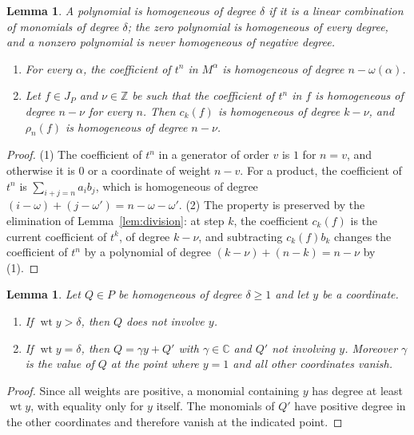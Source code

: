 \documentclass{amsart}
\newtheorem{lemma}[theorem]{Lemma}
\theoremstyle{definition}
\theoremstyle{remark}
\numberwithin{equation}{section}
\newcommand{\CC}{\mathbb{C}}
\newcommand{\ZZ}{\mathbb{Z}}
\DeclareMathOperator{\wt}{wt}
\begin{document}
\begin{lemma}\label{lem:homog}
A polynomial is homogeneous of degree $\delta$ if it is a linear combination of monomials of degree $\delta$; the zero polynomial is homogeneous of every degree, and a nonzero polynomial is never homogeneous of negative degree.
\begin{enumerate}
\item For every $\alpha$, the coefficient of $t^n$ in $M^\alpha$ is homogeneous of degree $n-\omega(\alpha)$.
\item Let $f\in J_P$ and $\nu\in\ZZ$ be such that the coefficient of $t^n$ in $f$ is homogeneous of degree $n-\nu$ for every $n$. Then $c_k(f)$ is homogeneous of degree $k-\nu$, and $\rho_n(f)$ is homogeneous of degree $n-\nu$.
\end{enumerate}
\end{lemma}

\begin{proof}
(1) The coefficient of $t^n$ in a generator of order $v$ is $1$ for $n=v$, and otherwise it is $0$ or a coordinate of weight $n-v$. For a product, the coefficient of $t^n$ is $\sum_{i+j=n}a_ib_j$, which is homogeneous of degree $(i-\omega)+(j-\omega')=n-\omega-\omega'$. (2) The property is preserved by the elimination of Lemma~\ref{lem:division}: at step $k$, the coefficient $c_k(f)$ is the current coefficient of $t^k$, of degree $k-\nu$, and subtracting $c_k(f)b_k$ changes the coefficient of $t^n$ by a polynomial of degree $(k-\nu)+(n-k)=n-\nu$ by (1).
\end{proof}

\begin{lemma}\label{lem:linear}
Let $Q\in P$ be homogeneous of degree $\delta\ge1$ and let $y$ be a coordinate.
\begin{enumerate}
\item If $\wt y>\delta$, then $Q$ does not involve $y$.
\item If $\wt y=\delta$, then $Q=\gamma y+Q'$ with $\gamma\in\CC$ and $Q'$ not involving $y$. Moreover $\gamma$ is the value of $Q$ at the point where $y=1$ and all other coordinates vanish.
\end{enumerate}
\end{lemma}

\begin{proof}
Since all weights are positive, a monomial containing $y$ has degree at least $\wt y$, with equality only for $y$ itself. The monomials of $Q'$ have positive degree in the other coordinates and therefore vanish at the indicated point.
\end{proof}
\end{document}
